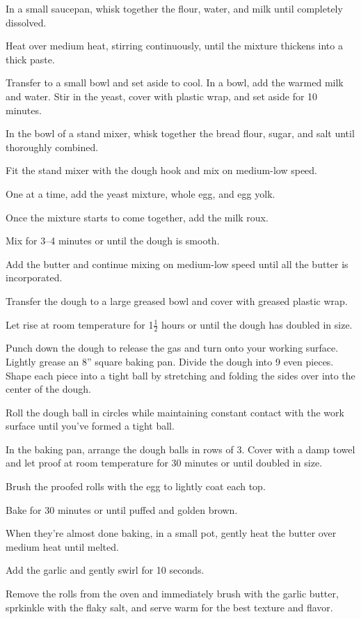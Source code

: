 \begin{method}
        In a small saucepan, whisk together the flour, water, and milk until completely dissolved.\par
        Heat over medium heat, stirring continuously, until the mixture thickens into a thick paste.\par
        Transfer to a small bowl and set aside to cool.
        In a bowl, add the warmed milk and water. Stir in the yeast, cover with plastic wrap, and set aside for 10 minutes.\par
        In the bowl of a stand mixer, whisk together the bread flour, sugar, and salt until thoroughly combined.\par
        Fit the stand mixer with the dough hook and mix on medium-low speed.\par
        One at a time, add the yeast mixture, whole egg, and egg yolk.\par
        Once the mixture starts to come together, add the milk roux.\par
        Mix for 3--4 minutes or until the dough is smooth.\par
        Add the butter and continue mixing on medium-low speed until all the butter is incorporated.\par
        Transfer the dough to a large greased bowl and cover with greased plastic wrap.\par
        Let rise at room temperature for 1$\frac{1}{2}$ hours or until the dough has doubled in size.\par
        Punch down the dough to release the gas and turn onto your working surface.
        Lightly grease an 8'' square baking pan. Divide the dough into 9 even pieces. Shape each piece into a tight ball by stretching and folding the sides over into the center of the dough.\par
        Roll the dough ball in circles while maintaining constant contact with the work surface until you've formed a tight ball.\par
        In the baking pan, arrange the dough balls in rows of 3. Cover with a damp towel and let proof at room temperature for 30 minutes or until doubled in size.\par
        Brush the proofed rolls with the egg to lightly coat each top.\par
        Bake for 30 minutes or until puffed and golden brown.\par
        When they're almost done baking, in a small pot, gently heat the butter over medium heat until melted.\par
        Add the garlic and gently swirl for 10 seconds.\par
        Remove the rolls from the oven and immediately brush with the garlic butter, sprkinkle with the flaky salt, and serve warm for the best texture and flavor.
\end{method}
